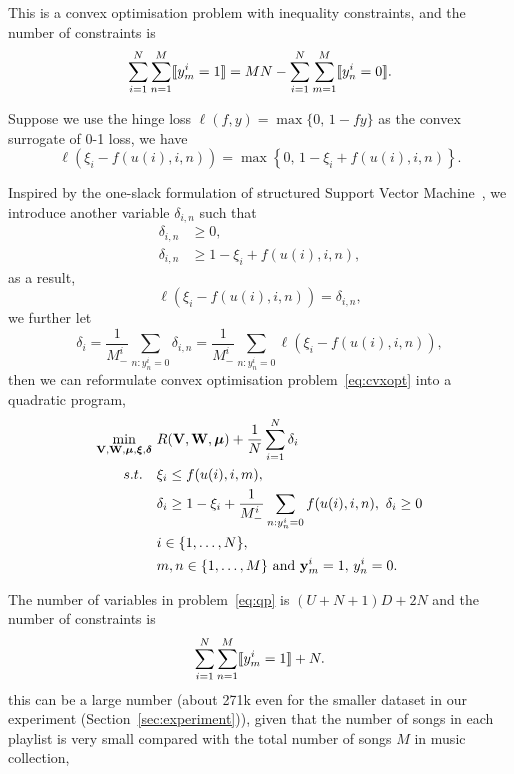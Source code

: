 This is a convex optimisation problem with inequality constraints, 
and the number of constraints is 
$$
\sum_{i=1}^N \sum_{n=1}^M \llbracket y_m^i = 1 \rrbracket = MN - \sum_{i=1}^N \sum_{m=1}^M \llbracket y_n^i = 0 \rrbracket.
$$

Suppose we use the hinge loss $\ell(f, y) = \max \{ 0, \, 1 - fy \}$ as the convex surrogate of 0-1 loss, we have
\begin{equation*}
\ell \left( \xi_i - f(u(i), i, n) \right) = \max \left\{ 0, \, 1 - \xi_i + f(u(i), i, n) \right\}.
\end{equation*}

Inspired by the one-slack formulation of structured Support Vector Machine~\cite{joachims2009cutting}, 
we introduce another variable $\delta_{i,n}$ such that
\begin{equation*}
\begin{aligned}
\delta_{i,n} & \ge 0, \\
\delta_{i,n} & \ge 1 - \xi_i + f(u(i), i, n),
\end{aligned}
\end{equation*}
as a result,
\begin{equation*}
\ell \left( \xi_i - f(u(i), i, n) \right) = \delta_{i,n},
\end{equation*}
we further let
\begin{equation*}
\delta_i = \frac{1}{M_-^i} \sum_{n: y_n^i = 0} \delta_{i,n} = \frac{1}{M_-^i} \sum_{n: y_n^i = 0} \ell \left( \xi_i - f(u(i), i, n) \right),
\end{equation*}
then we can reformulate convex optimisation problem~\ref{eq:cvxopt} into a quadratic program,
\begin{equation}
\label{eq:qp}
\begin{aligned}
\min_{\mathbf{V}, \mathbf{W}, \bm{\mu}, \bm{\xi}, {\bm{\delta}}} \ & R(\mathbf{V}, \mathbf{W}, \bm{\mu}) + \frac{1}{N} \sum_{i=1}^N \delta_i \\
s.t. \quad 
& \xi_i \le f(u(i), i, m), \\
& \delta_i \ge 1 - \xi_i + \frac{1}{M_-^i} \sum_{n: y_n^i = 0} f(u(i), i, n), \ \delta_i \ge 0 \\
& i \in \{1,\dots,N\}, \\
& m, n \in \{1,\dots,M\} \ \mathrm{and} \ \mathbf{y}_m^i = 1, \,  y_n^i = 0. 
\end{aligned}
\end{equation}

The number of variables in problem~\ref{eq:qp} is $(U + N + 1) D + 2N$ and the number of constraints is
$$
\sum_{i=1}^N \sum_{n=1}^M \llbracket y_m^i = 1 \rrbracket + N.
$$
%
this can be a large number (\eg about 271k even for the smaller dataset in our experiment (Section~\ref{sec:experiment})),
given that the number of songs in each playlist is very small compared with the total number of songs $M$ in music collection,


